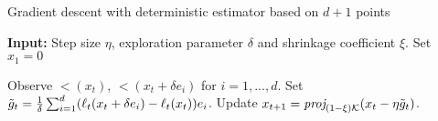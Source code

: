 \begin{algorithm} 
	\begin{algorithmic}
		\caption{Gradient descent with deterministic estimator based on $d+1$ points}\label{alg}
		\State \textbf{Input:} Step size $\eta$, exploration parameter $\delta$ and shrinkage coefficient $\xi$.
		\State Set $x_1 = 0$
	
			\State Observe $\lt(x_t)$, $\lt(x_t + \delta e_i)$ for $i=1,...,d$. 
			\State Set $\tildegt = \frac{1}{\delta} \sum_{i=1}^{d} (\lt(x_t + \delta e_i)-\lt(x_t))e_i$.
			\State Update $x_{t+1} = \proj[(1-\xi)\K]{(x_t - \eta \tilde{g}_t)}$.
		\EndFor

	\end{algorithmic}
\end{algorithm}